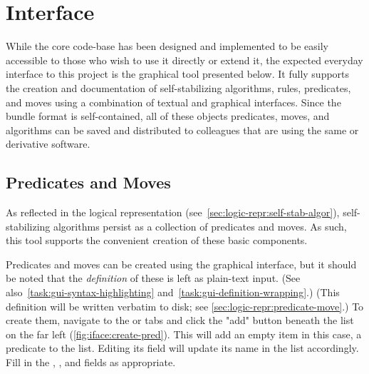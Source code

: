 \section{Interface}
\label{sec:interface-ssa}

While the core code-base has been designed and implemented
  to be easily accessible to those who wish to use it directly or extend it,
  the expected everyday interface to this project is
  the graphical tool presented below.
It fully supports the creation and documentation of
  self-stabilizing algorithms,
  rules,
  predicates,
  and moves
  using a combination of textual and graphical interfaces.
Since the bundle format is self-contained,
  all of these objects \Dash
  predicates, moves, and algorithms \Dash
  can be saved and distributed to colleagues
  that are using the same or derivative software.

\subsection{Predicates and Moves}
As reflected in the logical representation
  (see~\autoref{sec:logic-repr:self-stab-algor}),
  self-stabilizing algorithms persist as a collection
  of predicates and moves.
As such, this tool supports the convenient creation of these basic components.

Predicates and moves can be created using the graphical interface,
  but it should be noted that the \emph{definition} of these is left
  as plain-text input.
(See also~\autoref{task:gui-syntax-highlighting} and~\autoref{task:gui-definition-wrapping}.)
(This definition will be written verbatim to disk;
  see \autoref{sec:logic-repr:predicate-move}.)
To create them, navigate to the  or  tabs
  and click the "add" button beneath the list on the far left
  (\autoref{fig:iface:create-pred}).
This will add an empty item \Dash in this case, a predicate \Dash to the list.
Editing its  field will update its name in the list accordingly.
Fill in the , ,
  and \ifacefield{\TeX} fields as appropriate.

